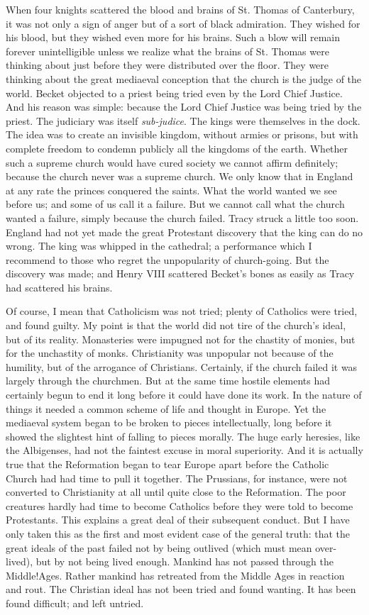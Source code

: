 \documentclass{book}
\begin{document}
When four knights scattered the blood and brains of St. Thomas of Canterbury, it was not only a sign of anger but of a sort of black admiration. They wished for his blood, but they wished even more for his brains. Such a blow will remain forever unintelligible unless we realize what the brains of St. Thomas were thinking about just before they were distributed over the floor. They were thinking about the great mediaeval conception that the church is the judge of the world. Becket objected to a priest being tried even by the Lord Chief Justice. And his reason was simple: because the Lord Chief Justice was being tried by the priest. The judiciary was itself \emph{sub-judice}. The kings were themselves in the dock. The idea was to create an invisible kingdom, without armies or prisons, but with complete freedom to condemn publicly all the kingdoms of the earth. Whether such a supreme church would have cured society we cannot affirm definitely; because the church never was a supreme church. We only know that in England at any rate the princes conquered the saints. What the world wanted we see before us; and some of us call it a failure. But we cannot call what the church wanted a failure, simply because the church failed. Tracy struck a little too soon. England had not yet made the great Protestant discovery that the king can do no wrong. The king was whipped in the cathedral; a performance which I recommend to those who regret the unpopularity of church-going. But the discovery was made; and Henry VIII scattered Becket’s bones as easily as Tracy had scattered his brains.

Of course, I mean that Catholicism was not tried; plenty of Catholics were tried, and found guilty. My point is that the world did not tire of the church’s ideal, but of its reality. Monasteries were impugned not for the chastity of monies, but for the unchastity of monks. Christianity was unpopular not because of the humility, but of the arrogance of Christians. Certainly, if the church failed it was largely through the churchmen. But at the same time hostile elements had certainly begun to end it long before it could have done its work. In the nature of things it needed a common scheme of life and thought in Europe. Yet the mediaeval system began to be broken to pieces intellectually, long before it showed the slightest hint of falling to pieces morally. The huge early heresies, like the Albigenses, had not the faintest excuse in moral superiority. And it is actually true that the Reformation began to tear Europe apart before the Catholic Church had had time to pull it together. The Prussians, for instance, were not converted to Christianity at all until quite close to the Reformation. The poor creatures hardly had time to become Catholics before they were told to become Protestants. This explains a great deal of their subsequent conduct. But I have only taken this as the first and most evident case of the general truth: that the great ideals of the past failed not by being outlived (which must mean over-lived), but by not being lived enough. Mankind has not passed through the Middle!Ages. Rather mankind has retreated from the Middle Ages in reaction and rout. The Christian ideal has not been tried and found wanting. It has been found difficult; and left untried.
\end{document}
